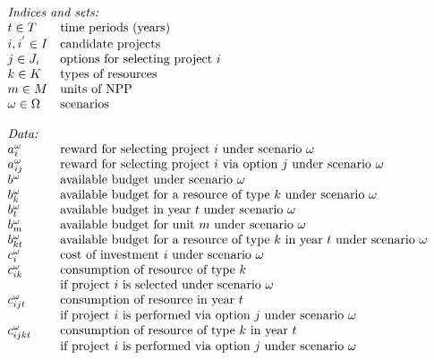 \[
\begin{array}{ll}
\multicolumn{2}{l}{\mbox{\em Indices and sets:} } \\
t \in T  & \mbox{time periods (years)} \\
i,i^{'} \in I  & \mbox{candidate projects} \\
j \in J_{i}	& \mbox{options for selecting project $i$} \\
k \in K	& \mbox{types of resources} \\
m \in M & \mbox{units of NPP} \\
\omega \in \Omega & \mbox{scenarios}\\
\\
\multicolumn{2}{l}{\mbox{\em Data:}} \\
a_{i}^{\omega} & \mbox{reward for selecting project $i$ under scenario $\omega$}  \\
a_{ij}^{\omega} & \mbox{reward for selecting project $i$ via option $j$ under scenario $\omega$}  \\
b^{\omega} & \mbox{available budget under scenario $\omega$}\\
b_{k}^{\omega} & \mbox{available budget for a resource of type $k$ under scenario $\omega$}\\
b_{t}^{\omega} & \mbox{available budget in year $t$ under scenario $\omega$}\\
b_{m}^{\omega} & \mbox{available budget for unit $m$ under scenario $\omega$}\\
b_{kt}^{\omega} & \mbox{available budget for a resource of type $k$ in year $t$ under scenario $\omega$}\\
c_{i}^{\omega} & \mbox{cost of investment $i$ under scenario $\omega$} \\
c_{ik}^{\omega} & \mbox{consumption of resource of type $k$} \\
& \mbox{if project $i$ is selected under scenario $\omega$}\\
c_{ijt}^{\omega} & \mbox{consumption of resource in year $t$ } \\
& \mbox{if project $i$ is performed via option $j$ under scenario $\omega$}\\
c_{ijkt}^{\omega} & \mbox{consumption of resource of type $k$ in year $t$ } \\
& \mbox{if project $i$ is performed via option $j$ under scenario $\omega$}\\

\end{array}\]
